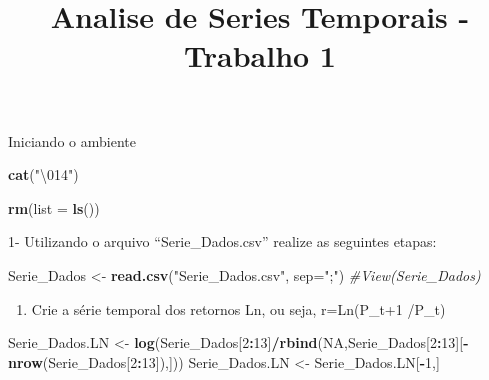 \documentclass[]{article}
\title{Analise de Series Temporais - Trabalho 1}
\author{}
\date{}
\newenvironment{Shaded}{\begin{snugshade}}{\end{snugshade}}
\newcommand{\KeywordTok}[1]{\textcolor[rgb]{0.13,0.29,0.53}{\textbf{#1}}}
\newcommand{\DataTypeTok}[1]{\textcolor[rgb]{0.13,0.29,0.53}{#1}}
\newcommand{\DecValTok}[1]{\textcolor[rgb]{0.00,0.00,0.81}{#1}}
\newcommand{\CharTok}[1]{\textcolor[rgb]{0.31,0.60,0.02}{#1}}
\newcommand{\StringTok}[1]{\textcolor[rgb]{0.31,0.60,0.02}{#1}}
\newcommand{\CommentTok}[1]{\textcolor[rgb]{0.56,0.35,0.01}{\textit{#1}}}
\newcommand{\OtherTok}[1]{\textcolor[rgb]{0.56,0.35,0.01}{#1}}
\newcommand{\OperatorTok}[1]{\textcolor[rgb]{0.81,0.36,0.00}{\textbf{#1}}}
\newcommand{\NormalTok}[1]{#1}
\providecommand{\tightlist}{%
  \setlength{\itemsep}{0pt}\setlength{\parskip}{0pt}}
\begin{document}
\maketitle

Iniciando o ambiente

\begin{Shaded}
\begin{Highlighting}[]
\KeywordTok{cat}\NormalTok{(}\StringTok{"}\CharTok{\textbackslash{}014}\StringTok{"}\NormalTok{)  }
\end{Highlighting}
\end{Shaded}



\begin{Shaded}
\begin{Highlighting}[]
\KeywordTok{rm}\NormalTok{(}\DataTypeTok{list =} \KeywordTok{ls}\NormalTok{())}
\end{Highlighting}
\end{Shaded}

1- Utilizando o arquivo ``Serie\_Dados.csv'' realize as seguintes
etapas:

\begin{Shaded}
\begin{Highlighting}[]
\NormalTok{Serie_Dados <-}\StringTok{ }\KeywordTok{read.csv}\NormalTok{(}\StringTok{"Serie_Dados.csv"}\NormalTok{, }\DataTypeTok{sep=}\StringTok{";"}\NormalTok{)}
\CommentTok{#View(Serie_Dados)}
\end{Highlighting}
\end{Shaded}

\begin{enumerate}
\def\labelenumi{\alph{enumi})}
\tightlist
\item
  Crie a série temporal dos retornos Ln, ou seja, r=Ln(P\_t+1 /P\_t)
\end{enumerate}

\begin{Shaded}
\begin{Highlighting}[]
\NormalTok{Serie_Dados.LN <-}\StringTok{ }\KeywordTok{log}\NormalTok{(Serie_Dados[}\DecValTok{2}\OperatorTok{:}\DecValTok{13}\NormalTok{]}\OperatorTok{/}\KeywordTok{rbind}\NormalTok{(}\OtherTok{NA}\NormalTok{,Serie_Dados[}\DecValTok{2}\OperatorTok{:}\DecValTok{13}\NormalTok{][}\OperatorTok{-}\KeywordTok{nrow}\NormalTok{(Serie_Dados[}\DecValTok{2}\OperatorTok{:}\DecValTok{13}\NormalTok{]),]))}
\NormalTok{Serie_Dados.LN <-}\StringTok{ }\NormalTok{Serie_Dados.LN[}\OperatorTok{-}\DecValTok{1}\NormalTok{,]}
\end{Highlighting}
\end{Shaded}
\end{document}
